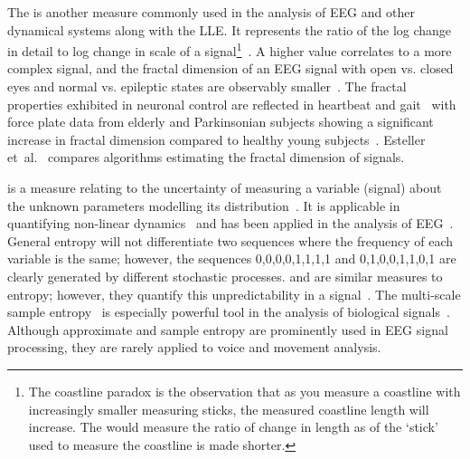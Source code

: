 \documentclass[12pt, twoside]{book}
\renewcommand\emph[1]{\textit{\color{USred}{#1}}}
\begin{document}





The \emph{fractal dimension} is another measure commonly used in the analysis of EEG and other dynamical systems along with the LLE. It represents the ratio of the log change in detail to log change in scale of a signal\footnote{The coastline paradox is the observation that as you measure a coastline with increasingly smaller measuring sticks, the measured coastline length will increase. The \emph{fractal dimension} would measure the ratio of change in length as of the `stick' used to measure the coastline is made shorter.}~\cite{mandelbrot1967long}. A higher value correlates to a more complex signal, and the fractal dimension of an EEG signal with open vs. closed eyes and normal vs. epileptic states are observably smaller~\cite{eegfractal, seizuredimensions}. The fractal properties exhibited in neuronal control are reflected in heartbeat and gait~\cite{fractalgait} with force plate data from elderly and Parkinsonian subjects showing a significant increase in fractal dimension compared to healthy young subjects~\cite{hfdcop, fractalpd, fractalbalance}. Esteller et~al.~\cite{fractaldimensions} compares algorithms estimating the fractal dimension of signals.


\emph{Fisher Information} is a measure relating to the uncertainty of measuring a variable (signal) about the unknown parameters modelling its distribution~\cite{fisherentropy}. It is applicable in quantifying non-linear dynamics~\cite{fisherinfo} and has been applied in the analysis of EEG~\cite{fisherinfo2}. General entropy will not differentiate two sequences where the frequency of each variable is the same; however, the sequences 0,0,0,0,1,1,1,1 and 0,1,0,0,1,1,0,1 are clearly generated by different stochastic processes. \emph{Approximate} and \emph{sample entropy} are similar measures to entropy; however, they quantify this unpredictability in a signal~\cite{apsampentropy, apentropy}. The multi-scale sample entropy~\cite{multiscaleentropy} is especially powerful tool in the analysis of biological signals~\cite{samplegaitmulti, sampleheart}. Although approximate and sample entropy are prominently used in EEG signal processing, they are rarely applied to voice and movement analysis. 
\end{document}
